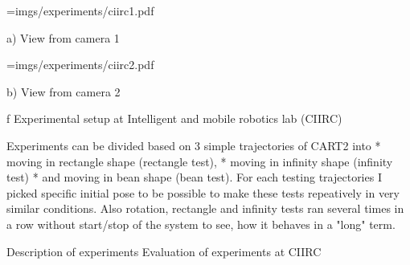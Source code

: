 \midinsert
\centerline {\picw=\hsize \inspic imgs/experiments/ciirc1.pdf }\nobreak
\centerline {a) View from camera 1}\nobreak\medskip
\centerline {\picw=\hsize \inspic imgs/experiments/ciirc2.pdf }\nobreak
\centerline {b) View from camera 2}\nobreak\medskip
{}
\caption/f Experimental setup at Intelligent and mobile robotics lab (CIIRC)
\endinsert

Experiments can be divided based on 3 simple trajectories of CART2 into
 \begitems
 	* moving in rectangle shape (rectangle test),
 	* moving in infinity shape (infinity test)
 	* and moving in bean shape (bean test).
 \enditems
 For each testing trajectories I picked specific initial pose to be possible to make these tests repeatively in very similar conditions. Also rotation, rectangle and infinity tests ran several times in a row without start/stop of the system to see, how it behaves in a "long" term.


\secc Description of experiments
\secc Evaluation of experiments at CIIRC

